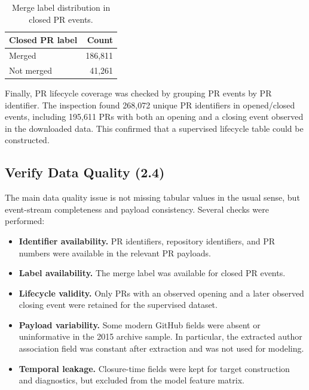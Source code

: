 \begin{table}[H]
    \centering
    \caption{Merge label distribution in closed PR events.}
    \label{tab:merge_labels}
    \begin{tabular}{lr}
        \toprule
        Closed PR label & Count \\
        \midrule
        Merged & 186,811 \\
        Not merged & 41,261 \\
        \bottomrule
    \end{tabular}
\end{table}

Finally, PR lifecycle coverage was checked by grouping PR events by PR identifier. The inspection found
268,072 unique PR identifiers in opened/closed events, including 195,611 PRs with both an opening and a
closing event observed in the downloaded data. This confirmed that a supervised lifecycle table could be constructed.

\subsection{Verify Data Quality (2.4)}

The main data quality issue is not missing tabular values in the usual sense, but event-stream completeness
and payload consistency. Several checks were performed:

\begin{itemize}
    \item \textbf{Identifier availability.} PR identifiers, repository identifiers, and PR numbers were
        available in the relevant PR payloads.
    \item \textbf{Label availability.} The merge label was available for closed PR events.
    \item \textbf{Lifecycle validity.} Only PRs with an observed opening and a later observed closing event
        were retained for the supervised dataset.
    \item \textbf{Payload variability.} Some modern GitHub fields were absent or uninformative in the 2015
        archive sample. In particular, the extracted author association field was constant after extraction
        and was not used for modeling.
    \item \textbf{Temporal leakage.} Closure-time fields were kept for target construction and diagnostics,
        but excluded from the model feature matrix.
\end{itemize}


